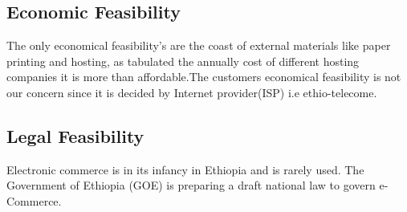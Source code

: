 
\subsection{Economic Feasibility}
The only economical feasibility's are the coast of external materials like paper printing and hosting, as tabulated the annually cost of different hosting companies it is more than affordable.The customers economical feasibility is not our concern since it is decided by Internet provider(ISP) i.e ethio-telecome.

\subsection{Legal Feasibility}
Electronic commerce is in its infancy in Ethiopia and is rarely used. The Government of Ethiopia (GOE) is preparing a draft national law to govern e-Commerce.

